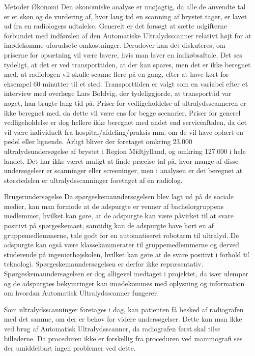 Metoder
Økonomi
Den økonomiske analyse er unøjagtig, da alle de anvendte tal er et skøn og de vurdering af, hvor lang tid en scanning af brystet tager, er lavet ud fra en radiologers udtalelse. Generelt er det forsøgt at sætte udgifterne forbundet med indførslen af den Automatiske Ultralydsscanner relativt højt for at imødekomme uforudsete omkostninger. Derudover kan det diskuteres, om priserne for opsætning vil være lavere, hvis man laver en indkøbsaftale. Det ses tydeligt, at det er ved transporttiden, at der kan spares, men det er ikke beregnet med, at radiologen vil skulle scanne flere på en gang, efter at have kørt for eksempel 60 minutter til et sted. Transporttiden er valgt som en variabel efter et interview med overlæge Lars Boldvig, der tydeliggjorde, at transporttid var noget, han brugte lang tid på. Priser for vedligeholdelse af ultralydsscanneren er ikke beregnet med, da dette vil være ens for begge scenarier. Priser for generel vedligeholdelse er dog hellere ikke beregnet med andet end serviceaftalen, da det vil være individuelt fra hospital/afdeling/praksis mm. om de vil have oplært en pedel eller lignende. Årligt bliver der foretaget omkring 23.000 ultralydsundersøgelse af brystet i Region Midtjylland, og omkring 127.000 i hele landet. Det har ikke været muligt at finde præcise tal på, hvor mange af disse undersøgelser er scanninger eller screeninger, men i analysen er det beregnet at størstedelen er ultralydsscanninger foretaget af en radiolog.  

Brugerundersøgelse
Da spørgeskemaundersøgelsen blev lagt ud på de sociale medier, kan man formode at de adspurgte er venner af bachelorgruppens medlemmer, hvilket kan gøre, at de adspurgte kan være påvirket til at svare positivt på spørgeskemaet, samtidig kan de adspurgte have hørt en af gruppemedlemmerne, tale godt for en automatiseret robotarm til ultralyd. De adspurgte kan også være klassekammerater til gruppemedlemmerne og derved studerende på ingeniørhøjskolen, hvilket kan gøre at de svare positivt i forhold til teknologi. Spørgeskemaundersøgelsen er derfor ikke repræsentativ. Spørgeskemaundersøgelsen er dog alligevel medtaget i projektet, da især ulemper og de adspurgtes bekymringer kan imødekommes med oplysning og information om hvordan Automatisk Ultralydsscanner fungerer. 

Som ultralydsscanninger foretages i dag, kan patienten få besked af radiografen med det samme, om der er behov for videre undersøgelser. Dette kan man ikke ved brug af Automatisk Ultralydsscanner, da radiografen først skal tilse billederne. Da proceduren ikke er forskellig fra proceduren ved mammografi ses der umiddelbart ingen problemer ved dette. 

